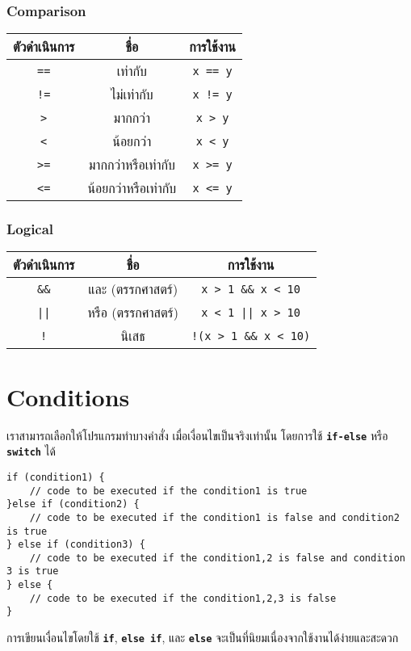 \subsubsection{Comparison}
\begin{center}
\begin{tabular}{||c|c|c||}
\hline
\textbf{ตัวดำเนินการ} & \textbf{ชื่อ} & \textbf{การใช้งาน} \\
\hline
\texttt{==} & เท่ากับ & \texttt{x == y} \\
\texttt{!=} & ไม่เท่ากับ & \texttt{x != y} \\
\texttt{>} & มากกว่า & \texttt{x > y} \\
\texttt{<} & น้อยกว่า & \texttt{x < y} \\
\texttt{>=} & มากกว่าหรือเท่ากับ & \texttt{x >= y} \\
\texttt{<=} & น้อยกว่าหรือเท่ากับ & \texttt{x <= y} \\
\hline
\end{tabular}
\end{center}

\subsubsection{Logical}
\begin{center}
\begin{tabular}{||c|c|c||}
\hline
\textbf{ตัวดำเนินการ} & \textbf{ชื่อ} & \textbf{การใช้งาน} \\
\hline
\texttt{\&\&} & และ (ตรรกศาสตร์) & \texttt{x > 1 \&\& x < 10} \\
\texttt{||} & หรือ (ตรรกศาสตร์) & \texttt{x < 1 || x > 10} \\
\texttt{!} & นิเสธ & \texttt{!(x > 1 \&\& x < 10)} \\
\hline
\end{tabular}
\end{center}

\newpage
\section{Conditions}
เราสามารถเลือกให้โปรแกรมทำบางคำสั่ง เมื่อเงื่อนไขเป็นจริงเท่านั้น โดยการใช้ \textbf{\texttt{if-else}} หรือ \textbf{\texttt{switch}} ได้
\begin{lstlisting}
if (condition1) {
	// code to be executed if the condition1 is true
}else if (condition2) {
	// code to be executed if the condition1 is false and condition2 is true
} else if (condition3) {
	// code to be executed if the condition1,2 is false and condition 3 is true
} else {
	// code to be executed if the condition1,2,3 is false
}
\end{lstlisting}
การเขียนเงื่อนไขโดยใช้ \textbf{\texttt{if}}, \textbf{\texttt{else if}}, และ \textbf{\texttt{else}} จะเป็นที่นิยมเนื่องจากใช้งานได้ง่ายและสะดวก

